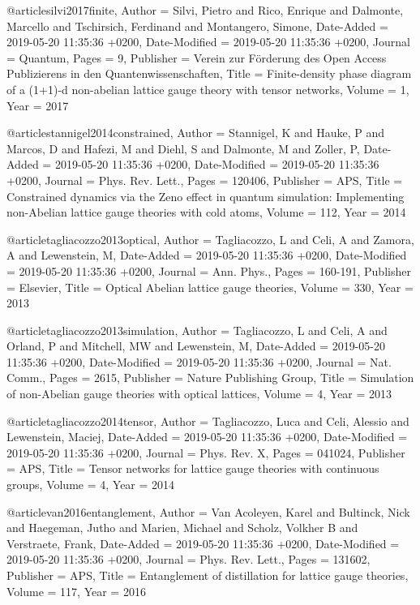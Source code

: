 \documentclass[epj,final]{svjour}
\begin{document}
@article{silvi2017finite,
	Author = {Silvi, Pietro and Rico, Enrique and Dalmonte, Marcello and Tschirsich, Ferdinand and Montangero, Simone},
	Date-Added = {2019-05-20 11:35:36 +0200},
	Date-Modified = {2019-05-20 11:35:36 +0200},
	Journal = {Quantum},
	Pages = {9},
	Publisher = {Verein zur F{\"o}rderung des Open Access Publizierens in den Quantenwissenschaften},
	Title = {Finite-density phase diagram of a (1+1)-d non-abelian lattice gauge theory with tensor networks},
	Volume = {1},
	Year = {2017}}

@article{stannigel2014constrained,
	Author = {Stannigel, K and Hauke, P and Marcos, D and Hafezi, M and Diehl, S and Dalmonte, M and Zoller, P},
	Date-Added = {2019-05-20 11:35:36 +0200},
	Date-Modified = {2019-05-20 11:35:36 +0200},
	Journal = {Phys. Rev. Lett.},
	Pages = {120406},
	Publisher = {APS},
	Title = {Constrained dynamics via the {Zeno} effect in quantum simulation: Implementing non-Abelian lattice gauge theories with cold atoms},
	Volume = {112},
	Year = {2014}}

@article{tagliacozzo2013optical,
	Author = {Tagliacozzo, L and Celi, A and Zamora, A and Lewenstein, M},
	Date-Added = {2019-05-20 11:35:36 +0200},
	Date-Modified = {2019-05-20 11:35:36 +0200},
	Journal = {Ann. Phys.},
	Pages = {160-191},
	Publisher = {Elsevier},
	Title = {Optical Abelian lattice gauge theories},
	Volume = {330},
	Year = {2013}}

@article{tagliacozzo2013simulation,
	Author = {Tagliacozzo, L and Celi, A and Orland, P and Mitchell, MW and Lewenstein, M},
	Date-Added = {2019-05-20 11:35:36 +0200},
	Date-Modified = {2019-05-20 11:35:36 +0200},
	Journal = {Nat. Comm.},
	Pages = {2615},
	Publisher = {Nature Publishing Group},
	Title = {Simulation of non-Abelian gauge theories with optical lattices},
	Volume = {4},
	Year = {2013}}

@article{tagliacozzo2014tensor,
	Author = {Tagliacozzo, Luca and Celi, Alessio and Lewenstein, Maciej},
	Date-Added = {2019-05-20 11:35:36 +0200},
	Date-Modified = {2019-05-20 11:35:36 +0200},
	Journal = {Phys. Rev. X},
	Pages = {041024},
	Publisher = {APS},
	Title = {Tensor networks for lattice gauge theories with continuous groups},
	Volume = {4},
	Year = {2014}}

@article{van2016entanglement,
	Author = {Van Acoleyen, Karel and Bultinck, Nick and Haegeman, Jutho and Marien, Michael and Scholz, Volkher B and Verstraete, Frank},
	Date-Added = {2019-05-20 11:35:36 +0200},
	Date-Modified = {2019-05-20 11:35:36 +0200},
	Journal = {Phys. Rev. Lett.},
	Pages = {131602},
	Publisher = {APS},
	Title = {Entanglement of distillation for lattice gauge theories},
	Volume = {117},
	Year = {2016}}
\end{document}
